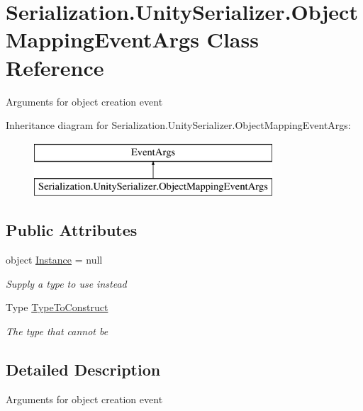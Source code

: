 \hypertarget{class_serialization_1_1_unity_serializer_1_1_object_mapping_event_args}{}\section{Serialization.\+Unity\+Serializer.\+Object\+Mapping\+Event\+Args Class Reference}
\label{class_serialization_1_1_unity_serializer_1_1_object_mapping_event_args}


Arguments for object creation event  


Inheritance diagram for Serialization.\+Unity\+Serializer.\+Object\+Mapping\+Event\+Args\+:\begin{figure}[H]
\begin{center}
\leavevmode
\includegraphics[height=2.000000cm]{class_serialization_1_1_unity_serializer_1_1_object_mapping_event_args}
\end{center}
\end{figure}
\subsection*{Public Attributes}
\begin{DoxyCompactItemize}
\item 
object \hyperlink{class_serialization_1_1_unity_serializer_1_1_object_mapping_event_args_a5898478872a7087989b8d101a53f91e5}{Instance} = null
\begin{DoxyCompactList}\small\item\em Supply a type to use instead \end{DoxyCompactList}\item 
Type \hyperlink{class_serialization_1_1_unity_serializer_1_1_object_mapping_event_args_a9ead5c88b710978c0671ea2d889be13e}{Type\+To\+Construct}
\begin{DoxyCompactList}\small\item\em The type that cannot be \end{DoxyCompactList}\end{DoxyCompactItemize}


\subsection{Detailed Description}
Arguments for object creation event 




